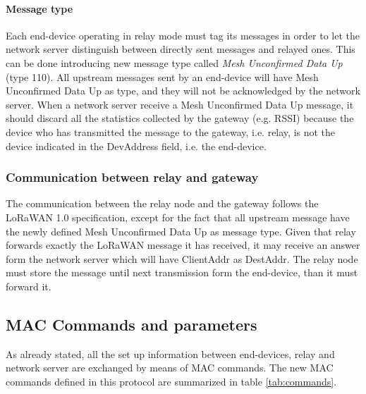 \paragraph{Message type}
Each end-device operating in relay mode must tag its messages in order to let the network server distinguish between directly sent messages and relayed ones. This can be done introducing new message type called \emph{Mesh Unconfirmed Data Up} (type 110). 
All upstream messages sent by an end-device will have Mesh Unconfirmed Data Up as type, and they will not be acknowledged by the network server.
When a network server receive a Mesh Unconfirmed Data Up message, it should discard all the statistics collected by the gateway (e.g. RSSI) because the device who has transmitted the message to the gateway, i.e. relay, is not the device indicated in the DevAddress field, i.e. the end-device.


\subsubsection{Communication between relay and gateway}
The communication between the relay node and the gateway follows the LoRaWAN 1.0 specification, except for the fact that all upstream message have the newly defined Mesh Unconfirmed Data Up as message type.
Given that relay forwards exactly the LoRaWAN message it has received, it may receive an answer form the network server which will have ClientAddr as DestAddr. The relay node must store the message until next transmission form the end-device, than it must forward it.


\subsection{MAC Commands and parameters}
As already stated, all the set up information between end-devices, relay and network server are exchanged by means of MAC commands. The new MAC commands defined in this protocol are summarized in table \ref{tab:commands}.


